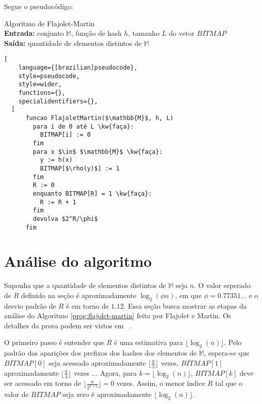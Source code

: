 Segue o pseudocódigo:
\begin{programruledcaption}{
Algoritmo de Flajolet-Martin 
\\ \textbf{Entrada:} conjunto $\mathbb{M}$, função de hash $h$, tamanho $L$ do vetor $BITMAP$ 
\\ \textbf{Saída:} quantidade de elementos distintos de $\mathbb{M}$
\label{prog:flajolet-martin}
}
  \begin{lstlisting}[
    language={[brazilian]pseudocode},
    style=pseudocode,
    style=wider,
    functions={},
    specialidentifiers={},
  ]
      funcao FlajoletMartin($\mathbb{M}$, h, L)
        para i de 0 até L \kw{faça}:
          BITMAP[i] := 0
        fim
        para x $\in$ $\mathbb{M}$ \kw{faça}:
          y := h(x)
          BITMAP[$\rho(y)$] := 1
        fim
        R := 0
        enquanto BITMAP[R] = 1 \kw{faça}:
          R := R + 1
        fim
        devolva $2^R/\phi$
      fim
  \end{lstlisting}
\end{programruledcaption}

\section{Análise do algoritmo}
\label{sec:flajolet-martin:analysis}

Suponha que a quantidade de elementos distintos de $\mathbb{M}$ seja $n$. O valor esperado de $R$ definido na seção 
 é aproximadamente $\log_2(\phi n)$, em que $\phi = 0.77351\dots$ e o desvio padrão 
de $R$ é em torno de $1.12$. Essa seção busca mostrar as etapas da análise do Algoritmo \ref{prog:flajolet-martin} feita 
por Flajolet e Martin. Os detalhes da prova podem ser vistos em ~\citep{flajolet:martin:85}.

O primeiro passo é entender que $R$ é uma estimativa para $\lfloor \log_2(n) \rfloor$. Pelo padrão das aparições dos 
prefixos dos hashes dos elementos de $\mathbb{M}$, espera-se que $BITMAP[0]$ seja acessado aproximadamente $\lfloor 
\frac{n}{2} \rfloor$ vezes, $BITMAP[1]$ aproximadamente $\lfloor \frac{n}{4} \rfloor$ vezes $\dots$ Agora, para 
$k = \lfloor \log_2(n) \rfloor$, $BITMAP[k]$ deve ser acessado em torno de $\lfloor \frac{n}{2^{k+1}} \rfloor = 0$ 
vezes. Assim, o menor índice $R$ tal que o valor de $BITMAP$ seja zero é aproximadamente $\lfloor \log_2(n) \rfloor$.

